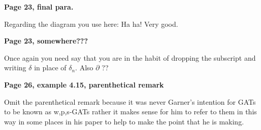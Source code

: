 \documentclass[10pt,a4paper]{scrartcl}
\newenvironment{comment}[1]
{\begin{framed}
\textbf{#1}
}
{
\end{framed}
}
\begin{document}
\begin{comment}{Page 23, final para.}
Regarding the diagram you use here: Ha ha! Very good.
\end{comment} 

\begin{comment}{Page 23, somewhere???}
Once again you need say that you are in the habit of dropping the subscript and writing $\delta$ in place of $\delta_n$. Also $\partial$ ??
\end{comment} 

\begin{comment}{Page 26, example 4.15, parenthetical remark}
Omit the parenthetical remark because it was never Garner's intention for GATs to be known as {w,p,s}-GATs rather it makes sense for him to refer to them in this way in some places in his paper to help to make the point that he is making.  
\end{comment} 
\end{document}
